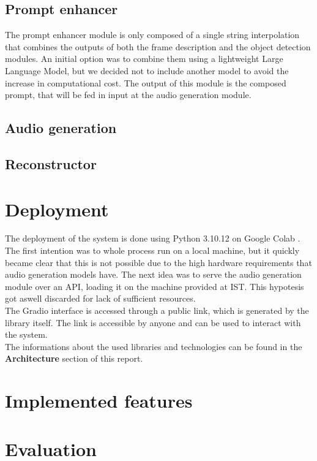 \documentclass[conference]{IEEEtran}
\begin{document}
\subsection{Prompt enhancer}
The prompt enhancer module is only composed of a single string interpolation that combines the outputs of both the frame description and the object detection modules. An initial option was to combine them using a lightweight Large Language Model, but we decided not to include another model to avoid the increase in computational cost.
The output of this module is the composed prompt, that will be fed in input at the audio generation module. 

\subsection{Audio generation}


\subsection{Reconstructor}


\section{Deployment}
The deployment of the system is done using Python 3.10.12 on Google Colab \cite{Colab}. The first intention was to whole process run on a local machine, but it quickly became clear that this is not possible due to the high hardware requirements that audio generation models have.
The next idea was to serve the audio generation module over an API, loading it on the machine provided at IST. This hypotesis got aswell discarded for lack of sufficient resources.
\\The Gradio interface is accessed through a public link, which is generated by the library itself. The link is accessible by anyone and can be used to interact with the system.
\\The informations about the used libraries and technologies can be found in the \textbf{Architecture} section of this report.

\section{Implemented features}

\section{Evaluation}
\end{document}
